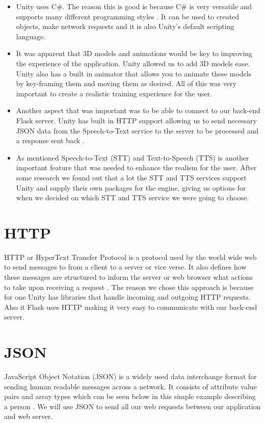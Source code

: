 \begin{itemize}
  \item Unity uses C\#. The reason this is good is because C\# is very versatile and supports many different programming styles \cite{csharp}. It can be used to created objects, make network requests and it is also Unity's default scripting language.
  \item It was apparent that 3D models and animations would be key to improving the experience of the application. Unity allowed us to add 3D models ease. Unity also has a built in animator that allows you to animate these models by key-framing them and moving them as desired. All of this was very important to create a realistic training experience for the user.
  \item Another aspect that was important was to be able to connect to our back-end Flask server. Unity has built in HTTP support allowing us to send necessary JSON data from the Speech-to-Text service to the server to be processed and a response sent back \cite{unitywebrequest}.
  \item As mentioned Speech-to-Text (STT) and Text-to-Speech (TTS) is another important feature that was needed to enhance the realism for the user. After some research we found out that a lot the STT and TTS services support Unity and supply their own packages for the engine, giving us options for when we decided on which STT and TTS service we were going to choose.
\end{itemize}

\section{HTTP}
HTTP or HyperText Transfer Protocol is a protocol used by the world wide web to send messages to from a client to a server or vice verse. It also defines how these messages are structured to inform the server or web browser what actions to take upon receiving a request \cite{rescorla2000http}. The reason we chose this approach is because for one Unity has libraries that handle incoming and outgoing HTTP requests. Also it Flask uses HTTP making it very easy to communicate with our back-end server.

\section{JSON}
JavaScript Object Notation (JSON) is a widely used data interchange format for sending human readable messages across a network. It consists of attribute value pairs and array types which can be seen below in this simple example describing a person \cite{chen2014javascript}. We will use JSON to send all our web requests between our application and web server.

